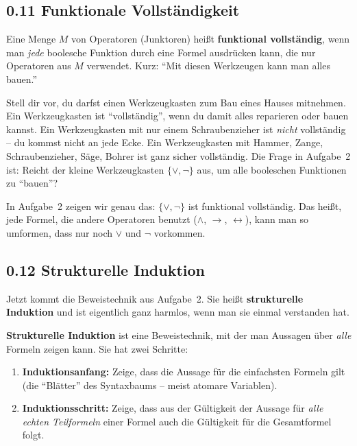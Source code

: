 \documentclass[a4paper,12pt]{article}
\begin{document}
\subsection*{0.11 Funktionale Vollst\"andigkeit}

\begin{merkbox}
Eine Menge $M$ von Operatoren (Junktoren) hei{\ss}t \textbf{funktional
vollst\"andig}, wenn man \emph{jede} boolesche Funktion durch eine
Formel ausdr\"ucken kann, die nur Operatoren aus $M$ verwendet. Kurz:
"`Mit diesen Werkzeugen kann man alles bauen."'
\end{merkbox}

\begin{analogie}
Stell dir vor, du darfst einen Werkzeugkasten zum Bau eines Hauses
mitnehmen. Ein Werkzeugkasten ist "`vollst\"andig"', wenn du damit
alles reparieren oder bauen kannst. Ein Werkzeugkasten mit nur einem
Schraubenzieher ist \emph{nicht} vollst\"andig -- du kommst nicht an
jede Ecke. Ein Werkzeugkasten mit Hammer, Zange, Schraubenzieher,
S\"age, Bohrer ist ganz sicher vollst\"andig. Die Frage in Aufgabe~2
ist: Reicht der kleine Werkzeugkasten $\{\vee, \neg\}$ aus, um alle
booleschen Funktionen zu "`bauen"'?
\end{analogie}

In Aufgabe~2 zeigen wir genau das: $\{\vee, \neg\}$ ist funktional
vollst\"andig. Das hei{\ss}t, jede Formel, die andere Operatoren
benutzt ($\wedge$, $\to$, $\leftrightarrow$), kann man so umformen,
dass nur noch $\vee$ und $\neg$ vorkommen.

\subsection*{0.12 Strukturelle Induktion}

Jetzt kommt die Beweistechnik aus Aufgabe~2. Sie hei{\ss}t
\textbf{strukturelle Induktion} und ist eigentlich ganz harmlos, wenn
man sie einmal verstanden hat.

\begin{merkbox}
\textbf{Strukturelle Induktion} ist eine Beweistechnik, mit der man
Aussagen \"uber \emph{alle} Formeln zeigen kann. Sie hat zwei
Schritte:
\begin{enumerate}[nosep]
\item \textbf{Induktionsanfang:} Zeige, dass die Aussage f\"ur die
      einfachsten Formeln gilt (die "`Bl\"atter"' des Syntaxbaums --
      meist atomare Variablen).
\item \textbf{Induktionsschritt:} Zeige, dass aus der G\"ultigkeit
      der Aussage f\"ur \emph{alle echten Teilformeln} einer Formel
      auch die G\"ultigkeit f\"ur die Gesamtformel folgt.
\end{enumerate}
\end{merkbox}
\end{document}
